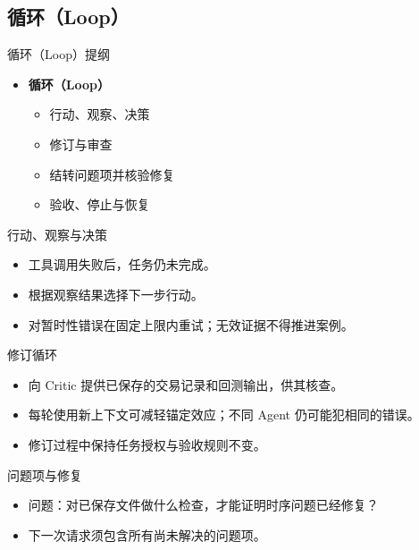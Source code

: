 \subsection{循环（Loop）}
\begin{frame}{循环（Loop）提纲}
\begin{itemize}
\item \textbf{循环（Loop）}
\begin{itemize}
\item 行动、观察、决策
\item 修订与审查
\item 结转问题项并核验修复
\item 验收、停止与恢复
\end{itemize}
\end{itemize}
\end{frame}
\begin{frame}{行动、观察与决策}
\begin{center}
\resizebox{.91\textwidth}{!}{}
\end{center}
\begin{itemize}
\item 工具调用失败后，任务仍未完成。
\item 根据观察结果选择下一步行动。
\item 对暂时性错误在固定上限内重试；无效证据不得推进案例。
\end{itemize}
\end{frame}
\begin{frame}{修订循环}
\setlength{\topsep}{0pt}
\begin{center}
\resizebox{.96\textwidth}{!}{}
\end{center}
\begin{itemize}
\item 向 Critic 提供已保存的交易记录和回测输出，供其核查。
\item 每轮使用新上下文可减轻锚定效应；不同 Agent 仍可能犯相同的错误。
\item 修订过程中保持任务授权与验收规则不变。
\end{itemize}
\end{frame}
\begin{frame}{问题项与修复\handsup}
\setlength{\topsep}{0pt}
\begin{center}
\resizebox{.94\textwidth}{!}{}
\end{center}
\begin{itemize}
\item 问题：对已保存文件做什么检查，才能证明时序问题已经修复？
\item 下一次请求须包含所有尚未解决的问题项。
\end{itemize}
\end{frame}
